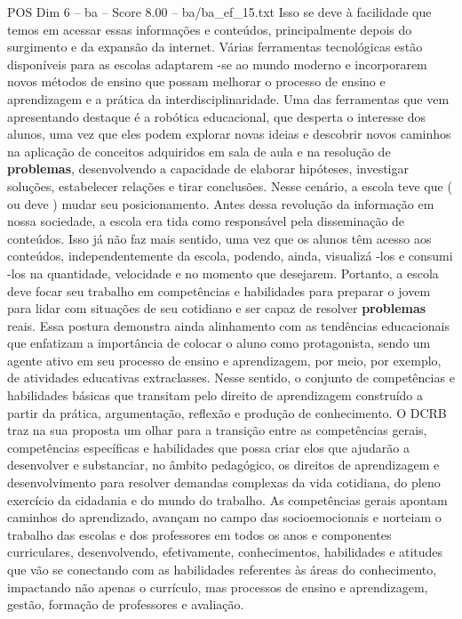 \begin{textsample}{POS Dim 6 – ba – Score 8.00 – ba/ba\_ef\_15.txt}
Isso se deve à facilidade que temos em acessar essas informações e conteúdos, principalmente depois do surgimento e da expansão da internet.
Várias ferramentas tecnológicas estão disponíveis para as escolas adaptarem -se ao mundo moderno e incorporarem novos métodos de ensino que possam melhorar o processo de ensino e aprendizagem e a prática da interdisciplinaridade.
Uma das ferramentas que vem apresentando destaque é a robótica educacional, que desperta o interesse dos alunos, uma vez que eles podem explorar novas ideias e descobrir novos caminhos na aplicação de conceitos adquiridos em sala de aula e na resolução de \textbf{problemas}, desenvolvendo a capacidade de elaborar hipóteses, investigar soluções, estabelecer relações e tirar conclusões.
Nesse cenário, a escola teve que ( ou deve ) mudar seu posicionamento.
Antes dessa revolução da informação em nossa sociedade, a escola era tida como responsável pela disseminação de conteúdos.
Isso já não faz mais sentido, uma vez que os alunos têm acesso aos conteúdos, independentemente da escola, podendo, ainda, visualizá -los e consumi -los na quantidade, velocidade e no momento que desejarem.
Portanto, a escola deve focar seu trabalho em competências e habilidades para preparar o jovem para lidar com situações de seu cotidiano e ser capaz de resolver \textbf{problemas} reais.
Essa postura demonstra ainda alinhamento com as tendências educacionais que enfatizam a importância de colocar o aluno como protagonista, sendo um agente ativo em seu processo de ensino e aprendizagem, por meio, por exemplo, de atividades educativas extraclasses.
Nesse sentido, o conjunto de competências e habilidades básicas que transitam pelo direito de aprendizagem construído a partir da prática, argumentação, reflexão e produção de conhecimento.
O DCRB traz na sua proposta um olhar para a transição entre as competências gerais, competências específicas e habilidades que possa criar elos que ajudarão a desenvolver e substanciar, no âmbito pedagógico, os direitos de aprendizagem e desenvolvimento para resolver demandas complexas da vida cotidiana, do pleno exercício da cidadania e do mundo do trabalho.
As competências gerais apontam caminhos do aprendizado, avançam no campo das socioemocionais e norteiam o trabalho das escolas e dos professores em todos os anos e componentes curriculares, desenvolvendo, efetivamente, conhecimentos, habilidades e atitudes que vão se conectando com as habilidades referentes às áreas do conhecimento, impactando não apenas o currículo, mas processos de ensino e aprendizagem, gestão, formação de professores e avaliação.

\end{textsample}
